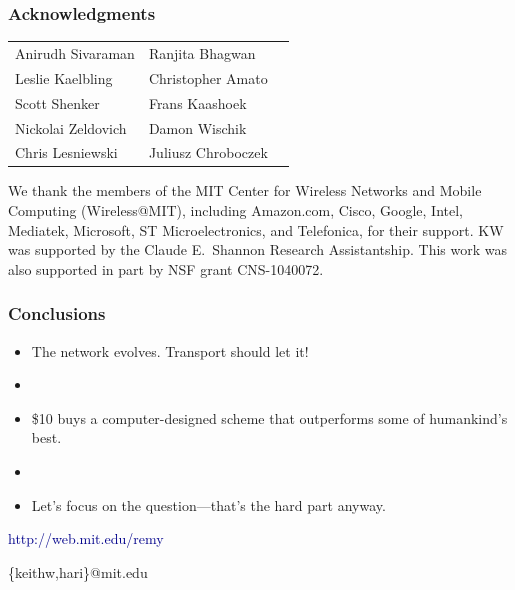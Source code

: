 \documentclass[svgnames]{beamer}
\newcommand{\ssline}{\vspace{8 pt}}
\begin{document}
\begin{frame}
\frametitle{Acknowledgments}

\begin{centering}
\begin{tabular}{lll}
Anirudh Sivaraman & Ranjita Bhagwan \\
Leslie Kaelbling & Christopher Amato \\
Scott Shenker & Frans Kaashoek \\
Nickolai Zeldovich & Damon Wischik \\
Chris Lesniewski & Juliusz Chroboczek \\
\end{tabular}

\end{centering}

\ssline
\ssline

\footnotesize We thank the members of the MIT Center for Wireless
Networks and Mobile Computing (Wireless@MIT), including Amazon.com,
Cisco, Google, Intel, Mediatek, Microsoft, ST Microelectronics, and
Telefonica, for their support. KW was supported by the Claude
E.~Shannon Research Assistantship. This work was also supported in
part by NSF grant CNS-1040072.

\end{frame}

\begin{frame}
\frametitle{Conclusions}

\large

\begin{itemize}

\item The network evolves. Transport should let it!

\item[]

\item \$10 buys a computer-designed scheme that outperforms some of
  humankind's best.

\item[]

\item Let's focus on the question---that's the hard part anyway.

\end{itemize}

\ssline

\begin{centering}

\textcolor{DarkBlue}{http://web.mit.edu/remy}

\vspace{\baselineskip}

\{keithw,hari\}@mit.edu

\end{centering}

\end{frame}
\end{document}
